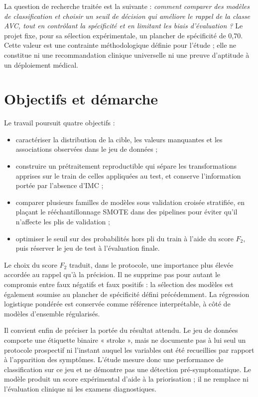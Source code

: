 La question de recherche traitée est la suivante : \textit{comment comparer des modèles de classification et choisir un seuil de décision qui améliore le rappel de la classe AVC, tout en contrôlant la spécificité et en limitant les biais d'évaluation ?} Le projet fixe, pour sa sélection expérimentale, un plancher de spécificité de 0,70. Cette valeur est une contrainte méthodologique définie pour l'étude ; elle ne constitue ni une recommandation clinique universelle ni une preuve d'aptitude à un déploiement médical.

\section*{Objectifs et démarche}
Le travail poursuit quatre objectifs :
\begin{itemize}
    \item caractériser la distribution de la cible, les valeurs manquantes et les associations observées dans le jeu de données ;
    \item construire un prétraitement reproductible qui sépare les transformations apprises sur le train de celles appliquées au test, et conserve l'information portée par l'absence d'IMC ;
    \item comparer plusieurs familles de modèles sous validation croisée stratifiée, en plaçant le rééchantillonnage SMOTE dans des pipelines pour éviter qu'il n'affecte les plis de validation ;
    \item optimiser le seuil sur des probabilités hors pli du train à l'aide du score $F_2$, puis réserver le jeu de test à l'évaluation finale.
\end{itemize}

Le choix du score $F_2$ traduit, dans le protocole, une importance plus élevée accordée au rappel qu'à la précision. Il ne supprime pas pour autant le compromis entre faux négatifs et faux positifs : la sélection des modèles est également soumise au plancher de spécificité défini précédemment. La régression logistique pondérée est conservée comme référence interprétable, à côté de modèles d'ensemble régularisés.

Il convient enfin de préciser la portée du résultat attendu. Le jeu de données comporte une étiquette binaire « stroke », mais ne documente pas à lui seul un protocole prospectif ni l'instant auquel les variables ont été recueillies par rapport à l'apparition des symptômes. L'étude mesure donc une performance de classification sur ce jeu et ne démontre pas une détection pré-symptomatique. Le modèle produit un score expérimental d'aide à la priorisation ; il ne remplace ni l'évaluation clinique ni les examens diagnostiques.

